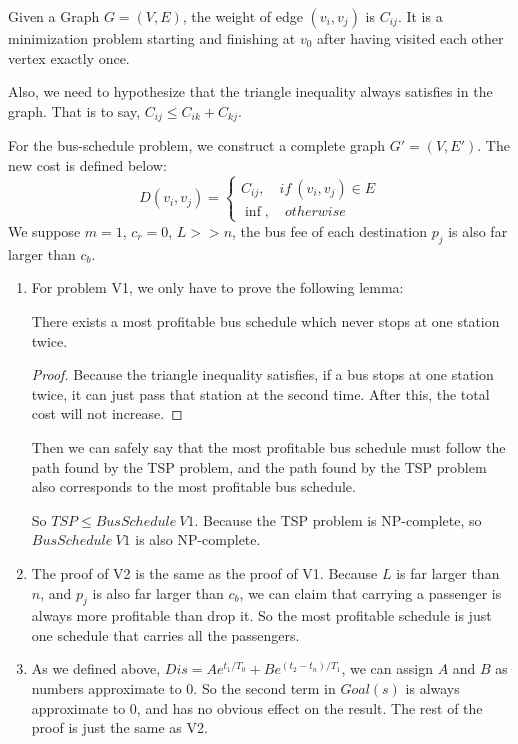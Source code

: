 \documentclass{llncs}
\begin{document}
Given a Graph $G = (V, E)$, the weight of edge $(v_i, v_j)$ is $C_{ij}$. It is a minimization problem starting and finishing at $v_0$ after having visited each other vertex exactly once.

Also, we need to hypothesize that the triangle inequality always satisfies in the graph. That is to say, $C_{ij} \leq C_{ik} + C_{kj}$.

For the bus-schedule problem, we construct a complete graph $G' = (V, E')$. The new cost is defined below:
\begin{equation}
D(v_i, v_j) = 
		\begin{cases}
		C_{ij},\quad if\ (v_i, v_j) \in E\\
		\inf,\quad otherwise
		\end{cases}
\end{equation}
We suppose $m = 1$, $c_r = 0$, $L >> n$, the bus fee of each destination $p_j$ is also far larger than $c_b$.

\begin{enumerate}
\item For problem V1, we only have to prove the following lemma:
\begin{lemma}
There exists a most profitable bus schedule which never stops at one station twice.
\end{lemma}
\begin{proof}
Because the triangle inequality satisfies, if a bus stops at one station twice, it can just pass that station at the second time. After this, the total cost will not increase.
\end{proof}
Then we can safely say that the most profitable bus schedule must follow the path found by the TSP problem, and the path found by the TSP problem also corresponds to the most profitable bus schedule.

So $TSP \leq BusSchedule\ V1 $. Because the TSP problem is NP-complete, so $BusSchedule\ V1$ is also NP-complete. 

\item The proof of V2 is the same as the proof of V1. Because $L$ is far larger than $n$, and $p_j$ is also far larger than $c_b$, we can claim that carrying a passenger is always more profitable than drop it. So the most profitable schedule is just one schedule that carries all the passengers.

\item As we defined above, $Dis = A e^{t_1/T_0} + B e^{(t_2 - t_n)/T_1}$, we can assign $A$ and $B$ as numbers approximate to $0$. So the second term in $Goal(s)$ is always approximate to $0$, and has no obvious effect on the result. The rest of the proof is just the same as V2.
\end{enumerate}
\end{document}
